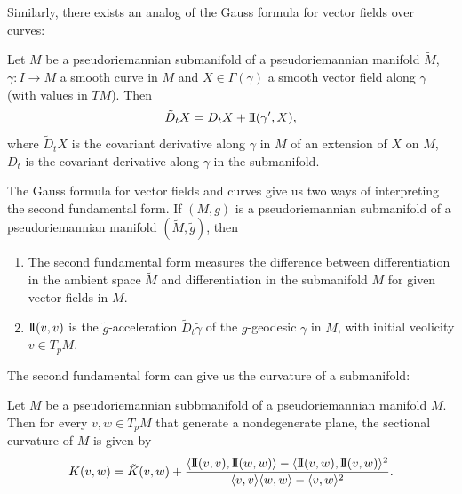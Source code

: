 \documentclass{report}
\begin{document}
Similarly, there exists an analog of the Gauss formula for vector fields over curves:
\begin{proposition}
    Let $M$ be a pseudoriemannian submanifold of a pseudoriemannian manifold $\tilde M$, $\gamma: I \to M$ a smooth curve in $M$ and $X \in \Gamma(\gamma)$ a smooth vector field along $\gamma$ (with values in $TM$).
    Then 
    \[
    \tilde D_t X = D_t X + \operatorname{I\!I}(\gamma', X),
    \]
    where $\tilde D_t X$ is the covariant derivative along $\gamma$ in $M$ of an extension of $X$ on $M$, $D_t$ is the covariant derivative along $\gamma$ in the submanifold.
\end{proposition}
\begin{remark}
    The Gauss formula for vector fields and curves give us two ways of interpreting the second fundamental form.
    If $(M, g)$ is a pseudoriemannian submanifold of a pseudoriemannian manifold $(\tilde M, \tilde g)$, then
    \begin{enumerate}
        \item The second fundamental form measures the difference between differentiation in the ambient space $\tilde M$ and differentiation in the submanifold $M$ for given vector fields in $M$.
        \item $\operatorname{I\!I}(v,v)$ is the $\tilde g$-acceleration $\tilde D_t \tilde \gamma$ of the $g$-geodesic $\gamma$ in $M$, with initial veolicity $v \in T_p M$.
    \end{enumerate}
\end{remark}
The second fundamental form can give us the curvature of a submanifold:
\begin{proposition}\label{prop:curvature_submanifold}
    Let $M$ be a pseudoriemannian subbmanifold of a pseudoriemannian manifold $M$.
    Then for every $v, w \in T_p M$ that generate a nondegenerate plane, the sectional curvature of $M$ is given by
    \[
    K(v,w) = \tilde K(v,w) + \frac{\langle \operatorname{I\!I}(v,v) ,\operatorname{I\!I}(w,w) \rangle - \langle \operatorname{I\!I}(v,w), \operatorname{I\!I}(v,w) \rangle^2}{ \langle v,v \rangle \langle w,w \rangle - \langle v,w \rangle^2}.
    \]
\end{proposition}
\end{document}
